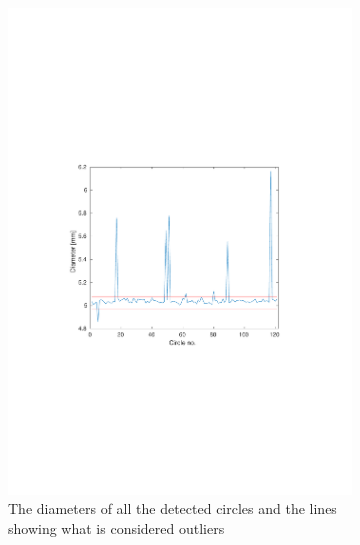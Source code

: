 \begin{figure}
\centering
\begin{subfigure}{0.72\textwidth}
  \centering
  \includegraphics[clip, trim=3.5cm 8cm 3.5cm 8cm, width=\linewidth]{Pictures/cal-outliers-diameter.pdf}
  \caption{The diameters of all the detected circles and the lines showing what is considered outliers}
  \label{fig:cal-out-diam}
\end{subfigure}
\begin{subfigure}{0.72\textwidth}
  \centering

\end{subfigure}
\end{figure}
